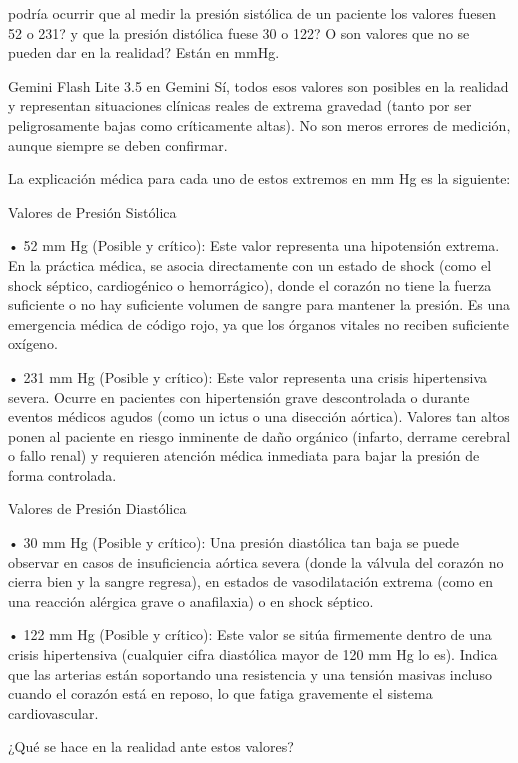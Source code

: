 \documentclass[12pt,a4paper,oneside]{book}
\begin{document}
\begin{iaprompt}
podría ocurrir que al medir la presión sistólica de un paciente los valores fuesen 52 o 231? y que la presión distólica fuese 30 o 122? O son valores que no se pueden dar en la realidad? Están en mmHg.
\end{iaprompt}
\begin{iaresp}{Gemini Flash Lite 3.5 en Gemini}
Sí, todos esos valores son posibles en la realidad y representan situaciones clínicas reales de extrema gravedad (tanto por ser peligrosamente bajas como críticamente altas). No son meros errores de medición, aunque siempre se deben confirmar.

La explicación médica para cada uno de estos extremos en mm Hg es la siguiente:

Valores de Presión Sistólica

• 52 mm Hg (Posible y crítico): Este valor representa una hipotensión extrema. En la práctica médica, se asocia directamente con un estado de shock (como el shock séptico, cardiogénico o hemorrágico), donde el corazón no tiene la fuerza suficiente o no hay suficiente volumen de sangre para mantener la presión. Es una emergencia médica de código rojo, ya que los órganos vitales no reciben suficiente oxígeno.

• 231 mm Hg (Posible y crítico): Este valor representa una crisis hipertensiva severa. Ocurre en pacientes con hipertensión grave descontrolada o durante eventos médicos agudos (como un ictus o una disección aórtica). Valores tan altos ponen al paciente en riesgo inminente de daño orgánico (infarto, derrame cerebral o fallo renal) y requieren atención médica inmediata para bajar la presión de forma controlada.

Valores de Presión Diastólica

• 30 mm Hg (Posible y crítico): Una presión diastólica tan baja se puede observar en casos de insuficiencia aórtica severa (donde la válvula del corazón no cierra bien y la sangre regresa), en estados de vasodilatación extrema (como en una reacción alérgica grave o anafilaxia) o en shock séptico.

• 122 mm Hg (Posible y crítico): Este valor se sitúa firmemente dentro de una crisis hipertensiva (cualquier cifra diastólica mayor de 120 mm Hg lo es). Indica que las arterias están soportando una resistencia y una tensión masivas incluso cuando el corazón está en reposo, lo que fatiga gravemente el sistema cardiovascular.

¿Qué se hace en la realidad ante estos valores?


\end{iaresp}
\end{document}
